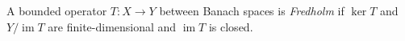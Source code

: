 
A bounded operator $T:X\to Y$ between Banach spaces is \emph{Fredholm} if $\ker T$ and $Y/\operatorname{im}T$ are finite-dimensional and $\operatorname{im}T$ is closed.
